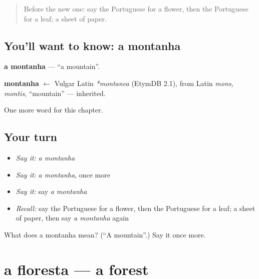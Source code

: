 \label{lesson:PT-C56-montanha}



\begin{quote}
Before the new one: say the Portuguese for a flower, then the Portuguese for a leaf; a sheet of paper.
\end{quote}

\subsection*{You'll want to know: a montanha}
\textbf{a montanha} — \textquotedblleft{}a mountain\textquotedblright{}.

\begin{cousinweb}
\textbf{montanha} $\leftarrow$ Vulgar Latin \emph{*montanea} (EtymDB 2.1), from Latin \emph{mons, montis}, \textquotedblleft{}mountain\textquotedblright{} — inherited.
\end{cousinweb}

\begin{grammarlens}[title={What you've built}]
One more word for this chapter.
\end{grammarlens}

\subsection*{Your turn}
\begin{itemize}
\raggedright
  \item \emph{Say it:} \emph{a montanha}
  \item \emph{Say it:} \emph{a montanha}, once more
  \item \emph{Say it:} say \emph{a montanha}
  \item \emph{Recall:} say the Portuguese for a flower, then the Portuguese for a leaf; a sheet of paper, then say \emph{a montanha} again
\end{itemize}

\begin{tcolorbox}[breakable,colback=teal!4,colframe=teal!35!black,title={Before you move on}]
What does a montanha mean? (\textquotedblleft{}A mountain\textquotedblright{}.) Say it once more.
\end{tcolorbox}
\section[a floresta]{a floresta — a forest}

\label{lesson:PT-C56-floresta}



